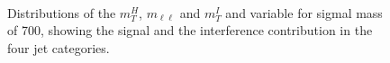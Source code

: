 \begin{figure}[htb]
\\


\caption{
    Distributions of the  $m_T^H$, $m_{\ell \ell}$ and $m_T^I$ and  variable for sigmal mass of 700\GeV, showing the signal and the interference contribution in the four jet categories.}
    \label{fig:700}
\end{figure}








